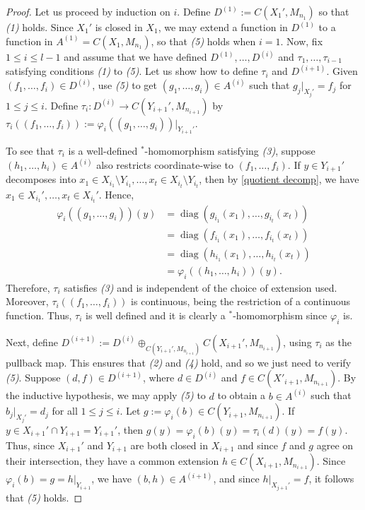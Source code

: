 \documentclass[12pt]{amsart}
\numberwithin{equation}{section}
\theoremstyle{definition}
\theoremstyle{remark}
\newcommand{\diag}{\operatorname{diag}}
\begin{document}
\begin{proof}
	Let us proceed by induction on $i$. Define $D^{(1)}:=C(X_{1}',M_{n_{1}})$ so that \textit{(1)} holds. Since $X_{1}'$ is closed in $X_{1}$, we may extend a function in $D^{(1)}$ to a function in $A^{(1)}=C(X_{1},M_{n_{1}})$, so that \textit{(5)} holds when $i=1$. Now, fix $1\leq i\leq  l-1$ and assume that we have defined $D^{(1)},\ldots,D^{(i)}$ and $\tau_{1},\ldots,\tau_{i-1}$ satisfying conditions \textit{(1)} to \textit{(5)}. Let us show how to define $\tau_{i}$ and $D^{(i+1)}$. Given $(f_{1},\ldots, f_{i})\in D^{(i)}$, use \textit{(5)} to get $(g_{1},\ldots,g_{i})\in A^{(i)}$ such that $g_{j}|_{X_{j}'}=f_{j}$ for $1\leq j\leq i$. Define $\tau_{i}\colon D^{(i)}\to C(Y_{i+1}',M_{n_{i+1}})$ by $\tau_{i}((f_{1},\ldots,f_{i})):=\varphi_{i}((g_{1},\ldots,g_{i}))|_{Y_{i+1}'}$. 
	
	To see that $\tau_{i}$ is a well-defined $^*$-homomorphism satisfying \textit{(3)}, suppose $(h_{1},\ldots,h_{i})\in A^{(i)}$ also restricts coordinate-wise to $(f_{1},\ldots,f_{i})$. If $y\in Y_{i+1}'$ decomposes into $x_{1}\in X_{i_{1}}\setminus Y_{i_{1}},\ldots,x_{t}\in X_{i_{t}}\setminus Y_{i_{t}}$, then by \autoref{quotient decomp}, we have $x_{1}\in X_{i_{1}}',\ldots,x_{t}\in X_{i_{t}}'$. Hence,
	$$
	\begin{aligned}
	\varphi_{i}((g_{1},\ldots,g_{i}))(y)&=\diag(g_{i_{1}}(x_{1}),\ldots,g_{i_{t}}(x_{t}))\\
	&=\diag(f_{i_{1}}(x_{1}),\ldots,f_{i_{t}}(x_{t}))\\
	&=\diag(h_{i_{1}}(x_{1}),\ldots,h_{i_{t}}(x_{t}))\\
	&=\varphi_{i}((h_{1},\ldots,h_{i}))(y).
	\end{aligned}
	$$
	Therefore, $\tau_{i}$ satisfies \textit{(3)} and is independent of the choice of extension used. Moreover, $\tau_{i}((f_{1},\ldots,f_{i}))$ is continuous, being the restriction of a continuous function. Thus, $\tau_{i}$ is well defined and it is clearly a $^*$-homomorphism since $\varphi_{i}$ is.  
	
	Next, define $D^{(i+1)}:=D^{(i)}\oplus_{C(Y_{i+1}',M_{n_{i+1}})}C(X_{i+1}',M_{n_{i+1}})$, using $\tau_{i}$ as the pullback map. This ensures that \textit{(2)} and \textit{(4)} hold, and so we just need to verify \textit{(5)}. Suppose $(d,f)\in D^{(i+1)}$, where $d\in D^{(i)}$ and $f\in C(X'_{i+1},M_{n_{i+1}})$. By the inductive hypothesis, we may apply \textit{(5)} to $d$ to obtain a $b\in A^{(i)}$ such that $b_{j}|_{X_{j}'}=d_{j}$ for all $1\leq j\leq i$. Let $g:=\varphi_{i}(b)\in C(Y_{i+1},M_{n_{i+1}})$. If $y\in X_{i+1}'\cap Y_{i+1}=Y_{i+1}'$, then $g(y)=\varphi_{i}(b)(y)=\tau_{i}(d)(y)=f(y)$. Thus, since $X_{i+1}'$ and $Y_{i+1}$ are both closed in $X_{i+1}$ and since $f$ and $g$ agree on their intersection, they have a common extension $h\in C(X_{i+1},M_{n_{i+1}})$. Since $\varphi_{i}(b)=g=h|_{Y_{i+1}}$, we have $(b,h)\in A^{(i+1)}$, and since $h|_{X_{j+1}'}=f$, it follows that \textit{(5)} holds. 
\end{proof}
\end{document}
